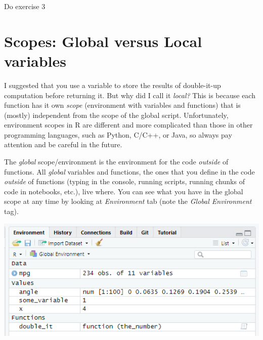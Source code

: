 \documentclass[
]{book}
\begin{document}
Do exercise 3

\hypertarget{scopes-global-versus-local-variables}{%
\section{Scopes: Global versus Local variables}\label{scopes-global-versus-local-variables}}

I suggested that you use a variable to store the results of double-it-up computation before returning it. But why did I call it \emph{local?} This is because each function has it own \emph{scope} (environment with variables and functions) that is (mostly) independent from the scope of the global script. Unfortunately, environment scopes in R are different and more complicated than those in other programming languages, such as Python, C/C++, or Java, so always pay attention and be careful in the future.

The \emph{global} scope/environment is the environment for the code \emph{outside} of functions. All \emph{global} variables and functions, the ones that you define in the code \emph{outside} of functions (typing in the console, running scripts, running chunks of code in notebooks, etc.), live where. You can see what you have in the global scope at any time by looking at \emph{Environment} tab (note the \emph{Global Environment} tag).

\begin{center}\includegraphics[width=0.7\linewidth]{images/environment-tab} \end{center}
\end{document}
